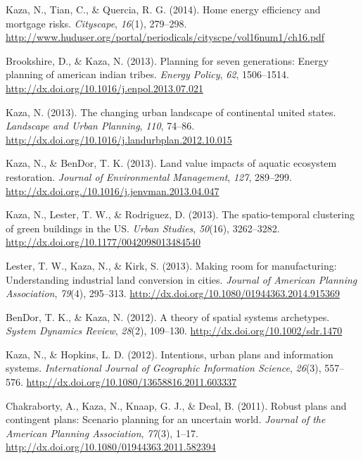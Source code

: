\documentclass[11pt,a4paper,]{awesome-cv}
\newlength{\cslhangindent}
\newenvironment{CSLReferences}[2] %
 {\begin{list}{}{%
  \setlength{\itemindent}{0pt}
  \setlength{\leftmargin}{0pt}
  \setlength{\parsep}{0pt}
  \ifodd #1
   \setlength{\leftmargin}{\cslhangindent}
   \setlength{\itemindent}{-1\cslhangindent}
  \fi
  \setlength{\itemsep}{#2\baselineskip}}}
 {\end{list}}
\begin{document}
\begin{CSLReferences}{1}{0}
Kaza, N., Tian, C., \& Quercia, R. G. (2014). Home energy efficiency and
mortgage risks. \emph{Cityscape}, \emph{16}(1), 279--298.
\url{http://www.huduser.org/portal/periodicals/cityscpe/vol16num1/ch16.pdf}

Brookshire, D., \& Kaza, N. (2013). Planning for seven generations:
Energy planning of american indian tribes. \emph{Energy Policy},
\emph{62}, 1506--1514.
\url{http://dx.doi.org/10.1016/j.enpol.2013.07.021}

Kaza, N. (2013). The changing urban landscape of continental united
states. \emph{Landscape and Urban Planning}, \emph{110}, 74--86.
\url{http://dx.doi.org/10.1016/j.landurbplan.2012.10.015}

Kaza, N., \& BenDor, T. K. (2013). Land value impacts of aquatic
ecosystem restoration. \emph{Journal of Environmental Management},
\emph{127}, 289--299.
\url{http://dx.doi.org./10.1016/j.jenvman.2013.04.047}

Kaza, N., Lester, T. W., \& Rodriguez, D. (2013). The spatio-temporal
clustering of green buildings in the US. \emph{Urban Studies},
\emph{50}(16), 3262--3282.
\url{http://dx.doi.org/10.1177/0042098013484540}

Lester, T. W., Kaza, N., \& Kirk, S. (2013). Making room for
manufacturing: Understanding industrial land conversion in cities.
\emph{Journal of American Planning Association}, \emph{79}(4), 295--313.
\url{http://dx.doi.org/10.1080/01944363.2014.915369}

BenDor, T. K., \& Kaza, N. (2012). A theory of spatial systems
archetypes. \emph{System Dynamics Review}, \emph{28}(2), 109--130.
\url{http://dx.doi.org/10.1002/sdr.1470}

Kaza, N., \& Hopkins, L. D. (2012). Intentions, urban plans and
information systems. \emph{International Journal of Geographic
Information Science}, \emph{26}(3), 557--576.
\url{http://dx.doi.org/10.1080/13658816.2011.603337}

Chakraborty, A., Kaza, N., Knaap, G. J., \& Deal, B. (2011). Robust
plans and contingent plans: Scenario planning for an uncertain world.
\emph{Journal of the American Planning Association}, \emph{77}(3),
1--17. \url{http://dx.doi.org/10.1080/01944363.2011.582394}


\end{CSLReferences}
\end{document}
